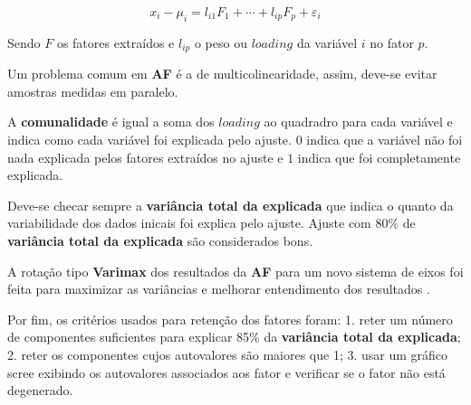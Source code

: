 \begin{equation}
  \label{eq:af}
  x_i-\mu_i = l_{i1} F_1 + \cdots + l_{ip} F_p + \varepsilon_i 
\end{equation}

Sendo $F$ os fatores extraídos e $l_{ip}$ o peso ou $loading$ 
da variável $i$ no fator $p$.

Um problema comum em \textbf{AF} é a de multicolinearidade, assim, 
deve-se evitar amostras medidas em paralelo. 

A \textbf{comunalidade} é igual a soma dos $loading$ ao quadradro 
para cada variável e indica como cada variável foi explicada pelo ajuste. 
$0$ indica que a variável não foi nada explicada pelos fatores extraídos 
no ajuste e $1$ indica que foi completamente explicada.

Deve-se checar sempre a \textbf{variância total da explicada} que indica 
o quanto da variabilidade dos dados inicais foi explica pelo ajuste. 
Ajuste com 80\% de \textbf{variância total da explicada} são considerados bons. 

A rotação tipo \textbf{Varimax} dos resultados da \textbf{AF} 
para um novo sistema de eixos foi feita para maximizar as variâncias 
e melhorar entendimento dos resultados \citep{kaiser1958}.

Por fim, os critérios usados para retenção dos fatores foram:
1. reter um número de componentes suficientes para explicar 85\% da 
   \textbf{variância total da explicada};
2. reter os componentes cujos autovalores são maiores que 1;
3. usar um gráfico scree exibindo os autovalores associados aos fator e
   verificar se o fator não está degenerado. 





